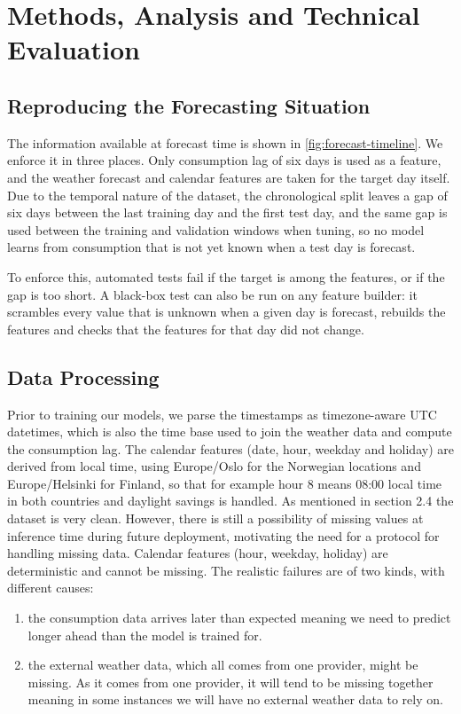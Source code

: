 \documentclass[11pt,a4paper]{article}
\begin{document}
\newpage
\section{Methods, Analysis and Technical Evaluation}
\label{sec:methods}
\subsection{Reproducing the Forecasting Situation}
The information available at forecast time is shown in \cref{fig:forecast-timeline}. We enforce it in three places. Only consumption lag of six days is used as a feature, and the weather forecast and calendar features are taken for the target day itself. Due to the temporal nature of the dataset, the chronological split leaves a gap of six days between the last training day and the first test day, and the same gap is used between the training and validation windows when tuning, so no model learns from consumption that is not yet known when a test day is forecast.

To enforce this, automated tests fail if the target is among the features, or if the gap is too short. A black-box test can also be run on any feature builder: it scrambles every value that is unknown when a given day is forecast, rebuilds the features and checks that the features for that day did not change.

\subsection{Data Processing}
\label{sec:data-processing}
Prior to training our models, we parse the timestamps as timezone-aware UTC datetimes, which is also the time base used to join the weather data and compute the consumption lag. The calendar features (date, hour, weekday and holiday) are derived from local time, using Europe/Oslo for the Norwegian locations and Europe/Helsinki for Finland, so that for example hour 8 means 08:00 local time in both countries and daylight savings is handled. As mentioned in section 2.4 the dataset is very clean. However, there is still a possibility of missing values at inference time during future deployment, motivating the need for a protocol for handling missing data. Calendar features (hour, weekday, holiday) are deterministic and cannot be missing. The realistic failures are of two kinds, with different causes:
\begin{enumerate}[itemsep=1pt, topsep=3pt]
    \item the consumption data arrives later than expected meaning we need to predict longer ahead than the model is trained for. 
    \item the external weather data, which all comes from one provider, might be missing. As it comes from one provider, it will tend to be missing together meaning in some instances we will have no external weather data to rely on.
\end{enumerate}
\end{document}
